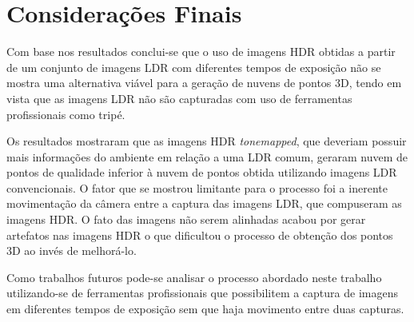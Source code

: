 \chapter{Considerações Finais} \label{conclusao}

Com base nos resultados conclui-se que o uso de imagens HDR obtidas a partir de um conjunto de imagens LDR com diferentes tempos de exposição não se mostra uma alternativa viável para a geração de nuvens de pontos 3D, tendo em vista que as imagens LDR não são capturadas com uso de ferramentas profissionais como tripé.

Os resultados mostraram que as imagens HDR \textit{tonemapped}, que deveriam possuir mais informações do ambiente em relação a uma LDR comum, geraram nuvem de pontos de qualidade inferior à nuvem de pontos obtida utilizando imagens LDR convencionais. O fator que se mostrou limitante para o processo foi a inerente movimentação da câmera entre a captura das imagens LDR, que compuseram as imagens HDR. O fato das imagens não serem alinhadas acabou por gerar artefatos nas imagens HDR o que dificultou o processo de obtenção dos pontos 3D ao invés de melhorá-lo.

Como trabalhos futuros pode-se analisar o processo abordado neste trabalho utilizando-se de ferramentas profissionais que possibilitem a captura de imagens em diferentes tempos de exposição sem que haja movimento entre duas capturas.



